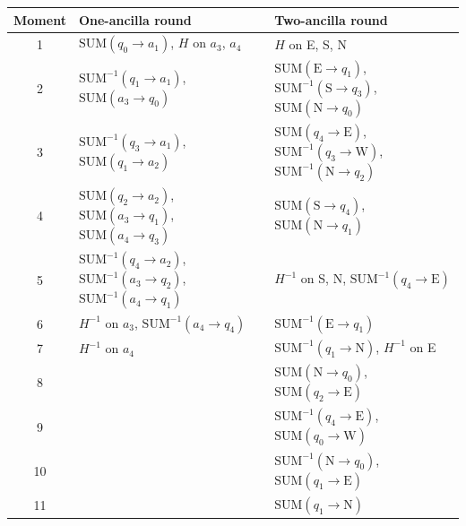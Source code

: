 \begin{table}[tp]
  \centering
  \footnotesize
  \setlength{\tabcolsep}{4pt}
  \begin{tabular}{c|l|l}
    \hline
    Moment & One-ancilla round & Two-ancilla round \\
    \hline
    1 & $\mathrm{SUM}(q_0 \to a_1)$, $H$ on $a_3$, $a_4$ & $H$ on E, S, N \\
    2 & $\mathrm{SUM}^{-1}(q_1 \to a_1)$, $\mathrm{SUM}(a_3 \to q_0)$ & $\mathrm{SUM}(\mathrm{E} \to q_1)$, $\mathrm{SUM}^{-1}(\mathrm{S} \to q_3)$, $\mathrm{SUM}(\mathrm{N} \to q_0)$ \\
    3 & $\mathrm{SUM}^{-1}(q_3 \to a_1)$, $\mathrm{SUM}(q_1 \to a_2)$ & $\mathrm{SUM}(q_4 \to \mathrm{E})$, $\mathrm{SUM}^{-1}(q_3 \to \mathrm{W})$, $\mathrm{SUM}^{-1}(\mathrm{N} \to q_2)$ \\
    4 & $\mathrm{SUM}(q_2 \to a_2)$, $\mathrm{SUM}(a_3 \to q_1)$, $\mathrm{SUM}(a_4 \to q_3)$ & $\mathrm{SUM}(\mathrm{S} \to q_4)$, $\mathrm{SUM}(\mathrm{N} \to q_1)$ \\
    5 & $\mathrm{SUM}^{-1}(q_4 \to a_2)$, $\mathrm{SUM}^{-1}(a_3 \to q_2)$, $\mathrm{SUM}^{-1}(a_4 \to q_1)$ & $H^{-1}$ on S, N, $\mathrm{SUM}^{-1}(q_4 \to \mathrm{E})$ \\
    6 & $H^{-1}$ on $a_3$, $\mathrm{SUM}^{-1}(a_4 \to q_4)$ & $\mathrm{SUM}^{-1}(\mathrm{E} \to q_1)$ \\
    7 & $H^{-1}$ on $a_4$ & $\mathrm{SUM}^{-1}(q_1 \to \mathrm{N})$, $H^{-1}$ on E \\
    8 & & $\mathrm{SUM}(\mathrm{N} \to q_0)$, $\mathrm{SUM}(q_2 \to \mathrm{E})$ \\
    9 & & $\mathrm{SUM}^{-1}(q_4 \to \mathrm{E})$, $\mathrm{SUM}(q_0 \to \mathrm{W})$ \\
    10 & & $\mathrm{SUM}^{-1}(\mathrm{N} \to q_0)$, $\mathrm{SUM}(q_1 \to \mathrm{E})$ \\
    11 & & $\mathrm{SUM}(q_1 \to \mathrm{N})$ \\
    \hline
  \end{tabular}

\end{table}
